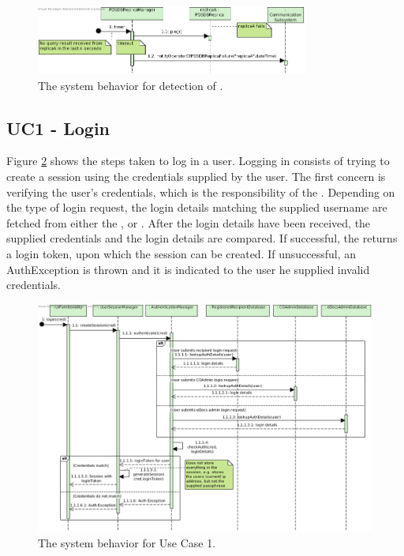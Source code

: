 \begin{figure}[!htp]
    \centering
    \includegraphics[width=0.8\textwidth]{figures/Av2 - PDSDBReplica fails.png}
    \caption{The system behavior for detection of .
        }\label{fig:seq_av2fail}
\end{figure}

\subsection{UC1 - Login}
Figure \ref{fig:seq_uc1} shows the steps taken to log in a user. Logging in consists of trying to create a session using the credentials supplied by the user. The first concern is verifying the user's credentials, which is the responsibility of the . Depending on the type of login request, the login details matching the supplied username are fetched from either the ,  or . After the login details have been received, the supplied credentials and the login details are compared. If successful, the  returns a login token, upon which the session can be created. If unsuccessful, an AuthException is thrown and it is indicated to the user he supplied invalid credentials.

\begin{figure}[!htp]
    \centering
    \includegraphics[width=\textwidth]{figures/UC1 - Login.png}
    \caption{The system behavior for Use Case 1.
        }\label{fig:seq_uc1}
\end{figure}

